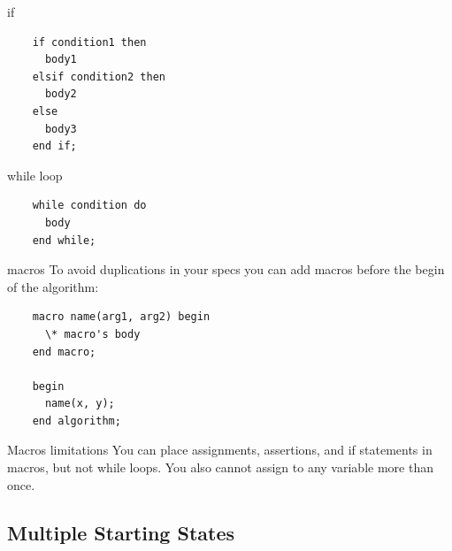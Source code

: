 \documentclass[10pt]{beamer}
\begin{document}
\begin{frame}[fragile]{if}
  \begin{verbatim}
    if condition1 then
      body1
    elsif condition2 then
      body2
    else
      body3
    end if;
  \end{verbatim}
\end{frame}

\begin{frame}[fragile]{while loop}
  \begin{verbatim}
    while condition do
      body
    end while;
  \end{verbatim}
\end{frame}

\begin{frame}[fragile]{macros}
  To avoid duplications in your specs you can add macros before the begin of the algorithm:
  
  \begin{verbatim}
    macro name(arg1, arg2) begin
      \* macro's body
    end macro;

    begin
      name(x, y);
    end algorithm;
  \end{verbatim}

  \begin{alertblock}{Macros limitations}
    You can place assignments, assertions, and if statements in macros, but not while loops. You also cannot assign to any variable more than once.
  \end{alertblock}
\end{frame}


\subsection{Multiple Starting States}

\end{document}
